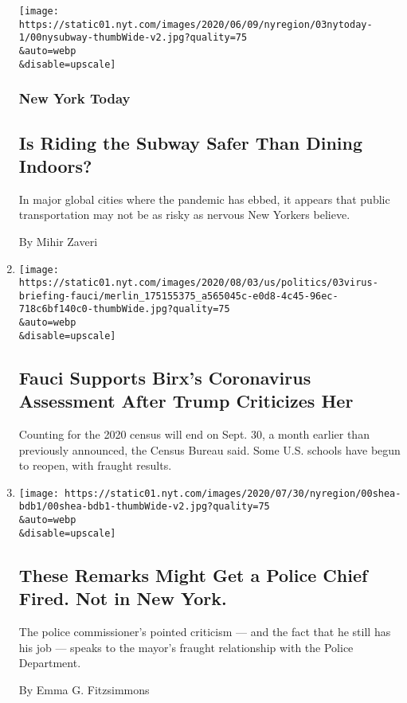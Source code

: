 \begin{enumerate}
  \texttt{[image: https://static01.nyt.com/images/2020/06/09/nyregion/03nytoday-1/00nysubway-thumbWide-v2.jpg?quality=75\\\&auto=webp\\\&disable=upscale]}

  \hypertarget{new-york-today-1}{%
  \subsubsection{New York Today}\label{new-york-today-1}}

  \hypertarget{is-riding-the-subway-safer-than-dining-indoors}{%
  \subsection{Is Riding the Subway Safer Than Dining
  Indoors?}\label{is-riding-the-subway-safer-than-dining-indoors}}

  In major global cities where the pandemic has ebbed, it appears that
  public transportation may not be as risky as nervous New Yorkers
  believe.

  By Mihir Zaveri
\item
  \href{/2020/08/03/world/coronavirus-covid-19.html}{}

  \texttt{[image: https://static01.nyt.com/images/2020/08/03/us/politics/03virus-briefing-fauci/merlin\_175155375\_a565045c-e0d8-4c45-96ec-718c6bf140c0-thumbWide.jpg?quality=75\\\&auto=webp\\\&disable=upscale]}

  \hypertarget{fauci-supports-birxs-coronavirus-assessment-after-trump-criticizes-her}{%
  \subsection{Fauci Supports Birx's Coronavirus Assessment After Trump
  Criticizes
  Her}\label{fauci-supports-birxs-coronavirus-assessment-after-trump-criticizes-her}}

  Counting for the 2020 census will end on Sept. 30, a month earlier
  than previously announced, the Census Bureau said. Some U.S. schools
  have begun to reopen, with fraught results.
\item
  \href{/2020/08/03/nyregion/police-shea-de-blasio-nyc.html}{}

  \texttt{[image: https://static01.nyt.com/images/2020/07/30/nyregion/00shea-bdb1/00shea-bdb1-thumbWide-v2.jpg?quality=75\\\&auto=webp\\\&disable=upscale]}

  \hypertarget{these-remarks-might-get-a-police-chief-fired-not-in-new-york}{%
  \subsection{These Remarks Might Get a Police Chief Fired. Not in New
  York.}\label{these-remarks-might-get-a-police-chief-fired-not-in-new-york}}

  The police commissioner's pointed criticism --- and the fact that he
  still has his job --- speaks to the mayor's fraught relationship with
  the Police Department.

  By Emma G. Fitzsimmons
\end{enumerate}


